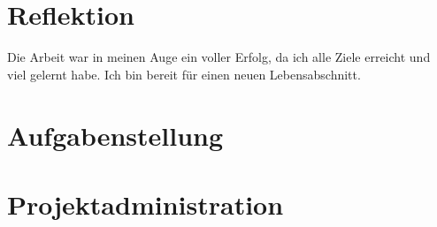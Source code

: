 \documentclass[
11pt, %
a4paper, %
BCOR25mm, %
DIV14, %
footsepline = false, %
headsepline, %
twoside, %
openright,
abstracton, %
listof=totocnumbered, %
bibliography=totocnumbered %
]{scrreprt}
\begin{document}
  \chapter{Reflektion}\label{chapter:Reflektion}
  
  Die Arbeit war in meinen Auge ein voller Erfolg, da ich alle Ziele erreicht
  und viel gelernt habe. Ich bin bereit für einen neuen
  Lebensabschnitt.

  \cleardoublepage
  
  
  \appendix
  
  
  
  \chapter{Aufgabenstellung}\label{chapter:Aufgabenstellung}
  
  

  \cleardoublepage
   
    
  \chapter{Projektadministration}\label{chapter:Projektadministration}
 
  

  \cleardoublepage
   
    
\end{document}
